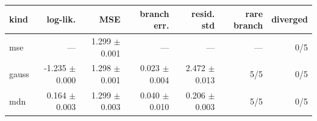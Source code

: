 \begin{tabular}{lrrrrrr}
\toprule
kind & log-lik. & MSE & branch err. & resid. std & rare branch & diverged \\
\midrule
mse & --- & 1.299 $\pm$ 0.001 & --- & --- & --- & 0/5 \\
gauss & -1.235 $\pm$ 0.000 & 1.298 $\pm$ 0.001 & 0.023 $\pm$ 0.004 & 2.472 $\pm$ 0.013 & 5/5 & 0/5 \\
mdn & 0.164 $\pm$ 0.003 & 1.299 $\pm$ 0.003 & 0.040 $\pm$ 0.010 & 0.206 $\pm$ 0.003 & 5/5 & 0/5 \\
\bottomrule
\end{tabular}
